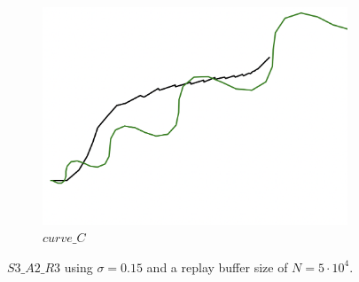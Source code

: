 \begin{figure}[H]
\begin{subfigure}[b]{0.31\textwidth}
         \includegraphics[width=\textwidth]{images/ddpg_results/envs_S3_S4_S5/S3_A2_R3_curve_C.png}
         \caption{$curve\_C$}
     \end{subfigure}
        \caption{$S3\_A2\_R3$ using $\sigma=0.15$ and a replay buffer size of $N=5\cdot 10^4$.}
        \label{fig:advCurves2}
\end{figure}


